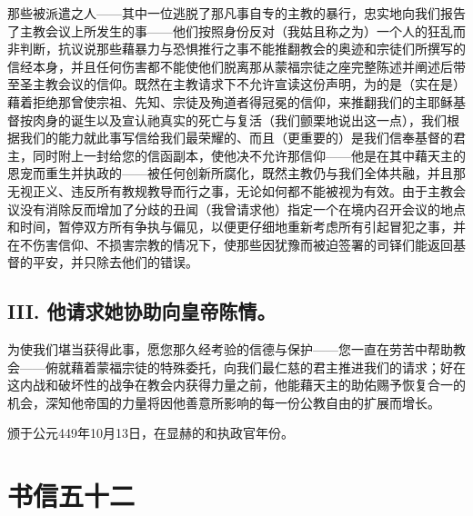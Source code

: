 那些被派遣之人——其中一位逃脱了那凡事自专的主教的暴行，忠实地向我们报告了主教会议上所发生的事——他们按照身份反对（我姑且称之为）一个人的狂乱而非判断，抗议说那些藉暴力与恐惧推行之事不能推翻教会的奥迹和宗徒们所撰写的信经本身，并且任何伤害都不能使他们脱离那从蒙福宗徒之座完整陈述并阐述后带至圣主教会议的信仰。既然在主教请求下不允许宣读这份声明，为的是（实在是）藉着拒绝那曾使宗祖、先知、宗徒及殉道者得冠冕的信仰，来推翻我们的主耶稣基督按肉身的诞生以及宣认祂真实的死亡与复活（我们颤栗地说出这一点），我们根据我们的能力就此事写信给我们最荣耀的、而且（更重要的）是我们信奉基督的君主，同时附上一封给您的信函副本，使他决不允许那信仰——他是在其中藉天主的恩宠而重生并执政的——被任何创新所腐化，既然主教仍与我们全体共融，并且那无视正义、违反所有教规教导而行之事，无论如何都不能被视为有效。由于主教会议没有消除反而增加了分歧的丑闻（我曾请求他）指定一个在境内召开会议的地点和时间，暂停双方所有争执与偏见，以便更仔细地重新考虑所有引起冒犯之事，并在不伤害信仰、不损害宗教的情况下，使那些因犹豫而被迫签署的司铎们能返回基督的平安，并只除去他们的错误。\par


\subsection{III. 他请求她协助向皇帝陈情。}

为使我们堪当获得此事，愿您那久经考验的信德与保护——您一直在劳苦中帮助教会——俯就藉着蒙福宗徒的特殊委托，向我们最仁慈的君主推进我们的请求；好在这内战和破坏性的战争在教会内获得力量之前，他能藉天主的助佑赐予恢复合一的机会，深知他帝国的力量将因他善意所影响的每一份公教自由的扩展而增长。\par

颁于公元449年10月13日，在显赫的和执政官年份。\par



\section{书信五十二}

